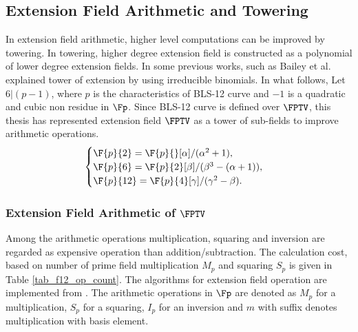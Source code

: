 \subsection{Extension Field Arithmetic and Towering}
In extension field arithmetic, higher level computations can be improved by towering. In towering, higher degree extension field is  constructed as a polynomial of lower degree extension fields.
In some previous works, such as Bailey et al. \cite{JC:BaiPaa01} explained tower of extension by using irreducible binomials. 
In what follows, Let $6|(p-1)$, where $p$ is the characteristics of BLS-12 curve and $-1$ is a quadratic and cubic non residue in $\Fp$. 
Since BLS-12 curve is defined over $\FPTV$, this thesis has represented extension field  $\FPTV$ as a tower of sub-fields to improve arithmetic operations.
\begin{equation}\label{BN_towering}
\begin{cases}
\F{p}{2} = \F{p}{}[\alpha]/(\alpha^2+1),  \\ 
\F{p}{6} = \F{p}{2}[\beta]/(\beta^3-(\alpha+1)),  \\ 
\F{p}{12} = \F{p}{4}[\gamma]/(\gamma^2-\beta). \\ 
\end{cases}
\end{equation}

\subsubsection*{Extension Field Arithmetic of $\FPTV$}
Among the arithmetic operations multiplication, squaring and inversion are regarded as expensive operation than addition/subtraction. The calculation cost, based on number of prime field multiplication $M_p$ and squaring $S_p$ is given in Table \ref{tab_f12_op_count}. The algorithms for extension field operation are implemented from \cite{EPRINT:DEHR15}. The arithmetic operations in $\Fp$ are denoted as $M_p$ for a multiplication, $S_p$ for a squaring, $I_p$ for an inversion and $m$ with suffix denotes multiplication with basis element.

\begin{table*}[t]
\caption{Number of arithmetic operations in $\FPTV$ based on \eqref{BN_towering}}
\label{tab_f12_op_count}
\centering
{}
\end{table*}

